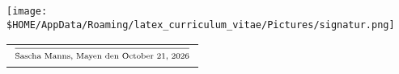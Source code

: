 \documentclass[a4paper]{friggeri-cv} %
\begin{document}
\begin{center}
\texttt{[image: \$HOME/AppData/Roaming/latex\_curriculum\_vitae/Pictures/signatur.png]} \\
\begin{tabular}{@{}l@{}}
\\ $\frac{}{\strut\textnormal{Sascha Manns, Mayen den \today}}$
\end{tabular}
\end{center}

\end{document}

